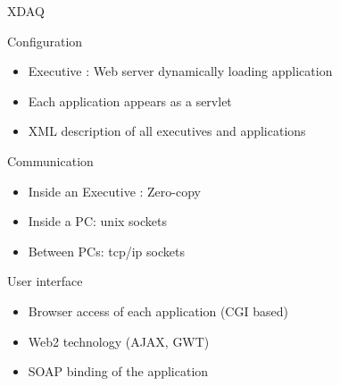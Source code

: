 \begin{frame}[shrink=5]{XDAQ}
  \begin{block}{Configuration}
    \begin{itemize}
    \item Executive : Web server dynamically loading application
    \item Each application appears as a servlet
    \item XML description of all executives and applications 
    \end{itemize}
  \end{block}
  \pause \begin{block}{Communication}
    \begin{itemize}
    \item Inside an Executive : Zero-copy
    \item Inside a PC: unix sockets
    \item Between PCs: tcp/ip sockets
    \end{itemize}
  \end{block}
  \pause 
  \begin{block}{User interface}
    \begin{itemize}
    \item Browser access of each application (CGI based)
    \item Web2 technology (AJAX, GWT)
    \item SOAP binding of the application
    \end{itemize}
  \end{block}
  
\end{frame}
